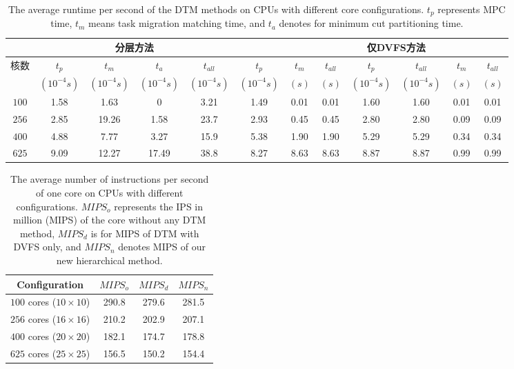   \begin{table}[h]
\tabcolsep=2pt
 \caption{The average runtime per second of the DTM methods on CPUs with
   different core configurations. $t_p$ represents MPC time, 
$t_m$ means task migration matching time, and $t_a$  denotes for minimum cut partitioning time.\label{tab:time}}{
 \begin{tabular}{|c|c|c|c|c|c|c|c|c|c|c|c|}
 \hline
	        & \multicolumn{4}{c|}{分层方法} & \multicolumn{3}{c|}{\cite{MaWang:APCCAS'14}} & \multicolumn{2}{c|}{仅DVFS方法}& \multicolumn{2}{c|}{\cite{Hanumaiah:TCAD'11}} \\
 \hline
核数	& $t_p$ & $t_m$ &$t_a$ &
$t_{all}$ & $t_p$ & $t_m$ &$t_{all}$  &
$t_p$ &$t_{all}$ & $t_{m}$ &$t_{all}$\\
                               &   $(10^{-4}s)$ & $(10^{-4}s)$ &
                               $(10^{-4}s)$ & $(10^{-4}s)$ & $(10^{-4}s)$
                               &   $(s)$  & $(s)$  & $(10^{-4}s)$ & $(10^{-4}s)$ &   $(s)$  & $(s)$\\
 \hline 
 \hline
$100$ & 1.58 & 1.63  & 0     & 3.21 & 1.49 & 0.01 & 0.01 & 1.60 & 1.60 & 0.01 & 0.01\\
 \hline
$256$ & 2.85 & 19.26 & 1.58  & 23.7 & 2.93 & 0.45 & 0.45 & 2.80 & 2.80 & 0.09 & 0.09\\
 \hline
$400$ & 4.88 & 7.77  & 3.27  & 15.9 & 5.38 & 1.90 & 1.90 & 5.29 & 5.29 & 0.34 & 0.34\\
 \hline
$625$ & 9.09 & 12.27 & 17.49 & 38.8 & 8.27 & 8.63 & 8.63 & 8.87 & 8.87 & 0.99 & 0.99\\
 \hline
 \hline
 \end{tabular}}
 \end{table}

\begin{table}[h]
\centering
 \caption{The average number of instructions per second of one core on
   CPUs with different configurations. $MIPS_o$ represents the IPS in million (MIPS) of the core without any DTM method,
$MIPS_d$ is for MIPS of DTM with DVFS only,
and $MIPS_n$ denotes MIPS of our new hierarchical method.\label{tab:ips}}{
 \begin{tabular}{|c|c|c|c|}
 \hline
 \hline
 Configuration  &$MIPS_o$ & $MIPS_d$  & $MIPS_n$ \\%
 \hline 
 \hline
 $100$ cores ($10 \times 10$) & 290.8 & 279.6 & 281.5 \\%
 \hline
 $256$ cores ($16 \times 16$) & 210.2 & 202.9 & 207.1 \\%
 \hline
 $400$ cores ($20 \times 20$) & 182.1 & 174.7 & 178.8 \\%
 \hline
 $625$ cores ($25 \times 25$) & 156.5 & 150.2 & 154.4 \\%
 \hline
 \hline
 \end{tabular}}
 \end{table}
 
